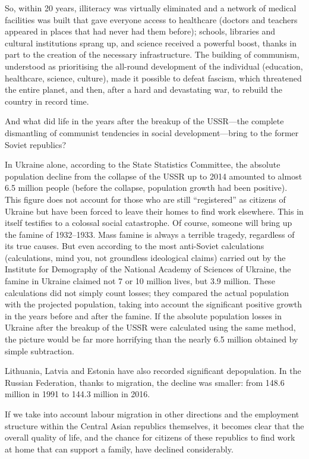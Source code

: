 \documentclass[12pt,a4paper,openany]{book}
\begin{document}
So, within 20 years, illiteracy was virtually eliminated and a network of medical facilities was built that gave everyone access to healthcare (doctors and teachers appeared in places that had never had them before); schools, libraries and cultural institutions sprang up, and science received a powerful boost, thanks in part to the creation of the necessary infrastructure. The building of communism, understood as prioritising the all-round development of the individual (education, healthcare, science, culture), made it possible to defeat fascism, which threatened the entire planet, and then, after a hard and devastating war, to rebuild the country in record time.

And what did life in the years after the breakup of the USSR—the complete dismantling of communist tendencies in social development—bring to the former Soviet republics?

In Ukraine alone, according to the State Statistics Committee, the absolute population decline from the collapse of the USSR up to 2014 amounted to almost 6.5 million people (before the collapse, population growth had been positive). This figure does not account for those who are still “registered” as citizens of Ukraine but have been forced to leave their homes to find work elsewhere. This in itself testifies to a colossal social catastrophe. Of course, someone will bring up the famine of 1932–1933. Mass famine is always a terrible tragedy, regardless of its true causes. But even according to the most anti-Soviet calculations (calculations, mind you, not groundless ideological claims) carried out by the Institute for Demography of the National Academy of Sciences of Ukraine, the famine in Ukraine claimed not 7 or 10 million lives, but 3.9 million. These calculations did not simply count losses; they compared the actual population with the projected population, taking into account the significant positive growth in the years before and after the famine. If the absolute population losses in Ukraine after the breakup of the USSR were calculated using the same method, the picture would be far more horrifying than the nearly 6.5 million obtained by simple subtraction.

Lithuania, Latvia and Estonia have also recorded significant depopulation. In the Russian Federation, thanks to migration, the decline was smaller: from 148.6 million in 1991 to 144.3 million in 2016.

If we take into account labour migration in other directions and the employment structure within the Central Asian republics themselves, it becomes clear that the overall quality of life, and the chance for citizens of these republics to find work at home that can support a family, have declined considerably.
\end{document}
